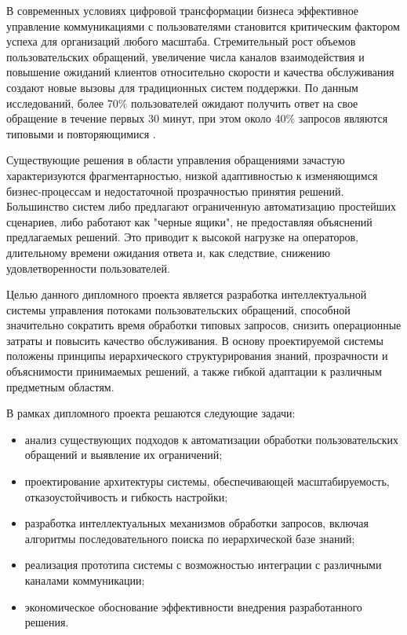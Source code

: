 
В современных условиях цифровой трансформации бизнеса эффективное управление коммуникациями с пользователями становится критическим фактором успеха для организаций любого масштаба. Стремительный рост объемов пользовательских обращений, увеличение числа каналов взаимодействия и повышение ожиданий клиентов относительно скорости и качества обслуживания создают новые вызовы для традиционных систем поддержки. По данным исследований, более 70\% пользователей ожидают получить ответ на свое обращение в течение первых 30 минут, при этом около 40\% запросов являются типовыми и повторяющимися \cite{gladlyReport}.

Существующие решения в области управления обращениями зачастую характеризуются фрагментарностью, низкой адаптивностью к изменяющимся бизнес-процессам и недостаточной прозрачностью принятия решений. Большинство систем либо предлагают ограниченную автоматизацию простейших сценариев, либо работают как "черные ящики", не предоставляя объяснений предлагаемых решений. Это приводит к высокой нагрузке на операторов, длительному времени ожидания ответа и, как следствие, снижению удовлетворенности пользователей.

Целью данного дипломного проекта является разработка интеллектуальной системы управления потоками пользовательских обращений, способной значительно сократить время обработки типовых запросов, снизить операционные затраты и повысить качество обслуживания. В основу проектируемой системы положены принципы иерархического структурирования знаний, прозрачности и объяснимости принимаемых решений, а также гибкой адаптации к различным предметным областям.

В рамках дипломного проекта решаются следующие задачи:

\begin{itemize}
\item анализ существующих подходов к автоматизации обработки пользовательских обращений и выявление их ограничений;
\item проектирование архитектуры системы, обеспечивающей масштабируемость, отказоустойчивость и гибкость настройки;
\item разработка интеллектуальных механизмов обработки запросов, включая алгоритмы последовательного поиска по иерархической базе знаний;
\item реализация прототипа системы с возможностью интеграции с различными каналами коммуникации;
\item экономическое обоснование эффективности внедрения разработанного решения.
\end{itemize}

